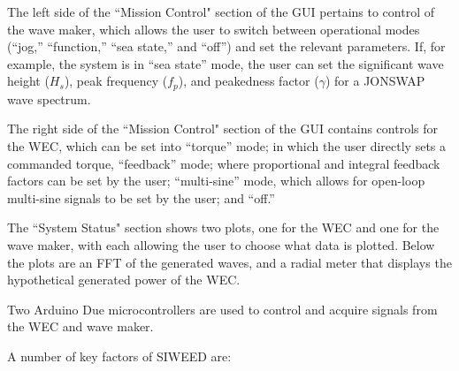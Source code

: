 \documentclass[11pt, letterpaper]{article}
\begin{document}
The left side of the ``Mission Control" section of the GUI pertains to control of the wave maker, which allows the user to switch between operational modes (``jog,'' ``function,'' ``sea state,'' and ``off'') and set the relevant parameters.
If, for example, the system is in ``sea state'' mode, the user can set the significant wave height ($H_s$), peak frequency ($f_p$), and peakedness factor ($\gamma$) for a JONSWAP wave spectrum.

The right side of the ``Mission Control" section of the GUI  contains controls for the WEC, which can be set into ``torque'' mode; in which the user directly sets a commanded torque, ``feedback'' mode; where proportional and integral feedback factors can be set by the user; ``multi-sine'' mode, which allows for open-loop multi-sine signals to be set by the user; and ``off.''

The ``System Status" section shows two plots, one for the WEC and one for the wave maker, with each allowing the user to choose what data is plotted. 
Below the plots are an FFT of the generated waves, and a radial meter that displays the hypothetical generated power of the WEC.

Two Arduino Due microcontrollers are used to control and acquire signals from the WEC and wave maker.

A number of key factors of SIWEED are:
\end{document}

